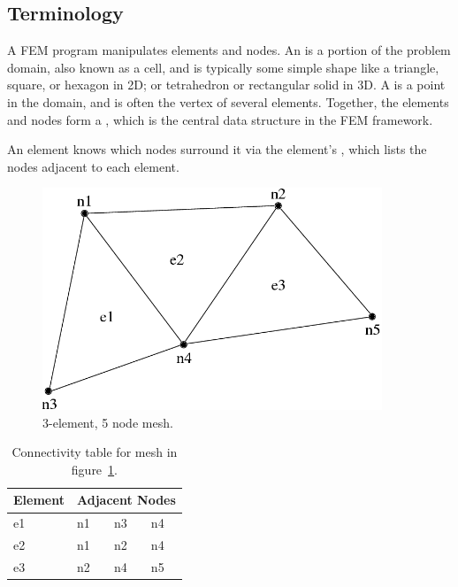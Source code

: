 \documentclass[10pt]{article}
\begin{document}
\subsection{Terminology}
\label{sec:terminology}

A FEM program manipulates elements and nodes. An  is a portion of
the problem domain, also known as a cell, and is typically some simple shape 
like a triangle, square, or hexagon in 2D; or tetrahedron or rectangular solid in 3D.  
A  is a point in the domain, and is often the vertex of several elements.  
Together, the elements and nodes form a , which is the 
central data structure in the FEM framework.

An element knows which nodes surround it via the element's
, which lists the nodes adjacent to each element.

\begin{figure}[h]
\begin{center}
\includegraphics[width=4in]{fig/simple_mesh}
\end{center}
\caption{3-element, 5 node mesh.}
\label{fig:simplemesh}
\end{figure}

\begin{table}[h]
\begin{center}
\begin{tabular}{||l||l|l|l||}\hline
Element & \multicolumn{3}{c||}{Adjacent Nodes} \\\hline
e1 & n1 & n3 & n4 \\
e2 & n1 & n2 & n4 \\
e3 & n2 & n4 & n5 \\
\hline
\end{tabular}
\end{center}
\caption{Connectivity table for mesh in figure~\ref{fig:simplemesh}.}
\label{table:simplemesh}
\end{table}
\end{document}
